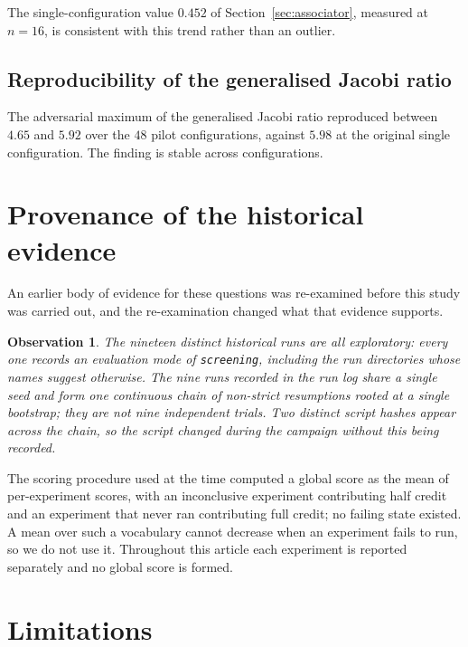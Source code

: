 \documentclass[11pt]{amsart}
\newtheorem{observation}{Observation}[section]
\theoremstyle{remark}
\begin{document}
The single-configuration value $0.452$ of Section~\ref{sec:associator}, measured at $n=16$,
is consistent with this trend rather than an outlier.

\subsection{Reproducibility of the generalised Jacobi ratio}

The adversarial maximum of the generalised Jacobi ratio reproduced between $4.65$ and
$5.92$ over the $48$ pilot configurations, against $5.98$ at the original single
configuration. The finding is stable across configurations.

\section{Provenance of the historical evidence}
\label{sec:provenance}

An earlier body of evidence for these questions was re-examined before this study was
carried out, and the re-examination changed what that evidence supports.

\begin{observation}
\label{obs:lineage}
The nineteen distinct historical runs are all exploratory: every one records an evaluation
mode of \texttt{screening}, including the run directories whose names suggest otherwise.
The nine runs recorded in the run log share a single seed and form one continuous chain of
non-strict resumptions rooted at a single bootstrap; they are not nine independent trials.
Two distinct script hashes appear across the chain, so the script changed during the
campaign without this being recorded.
\end{observation}

The scoring procedure used at the time computed a global score as the mean of per-experiment
scores, with an inconclusive experiment contributing half credit and an experiment that
never ran contributing full credit; no failing state existed. A mean over such a vocabulary
cannot decrease when an experiment fails to run, so we do not use it. Throughout this
article each experiment is reported separately and no global score is formed.

\section{Limitations}
\label{sec:limitations}
\end{document}
